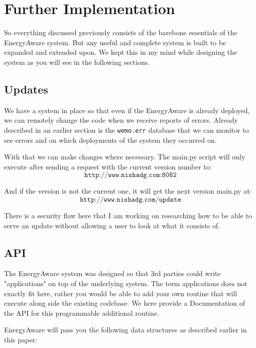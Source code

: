 \documentclass{sig-alternate-05-2015}
\begin{document}
\section{Further Implementation}

So everything discussed previously consists of the barebone essentials of the EnergyAware system. But any useful and complete system is built to be expanded and extended upon. We kept this in my mind while designing the system as you will see in the following sections.

\subsection{Updates}

We have a system in place so that even if the EnergyAware is already deployed, we can remotely change the code when we receive reports of errors. Already described in an earlier section is the \texttt{wemo.err} database that we can monitor to see errors and on which deployments of the system they occurred on.

With that we can make changes where necessary. The main.py script will only execute after sending a request with the current version number to:
\begin{equation*}
	\texttt{http://www.nishadg.com:8082} 
\end{equation*}

And if the version is not the current one, it will get the next version main.py at:
\begin{equation*}
	\texttt{http://www.nishadg.com/update} 
\end{equation*}

There is a security flaw here that I am working on researching how to be able to serve an update without allowing a user to look at what it consists of.

\subsection{API}

The EnergyAware system was designed so that 3rd parties could write "applications" on top of the underlying system. The term applications does not exactly fit here, rather you would be able to add your own routine that will execute along side the existing codebase. We here provide a Documentation of the API for this programmable additional routine.

EnergyAware will pass you the following data structures as described earlier in this paper:
\end{document}
